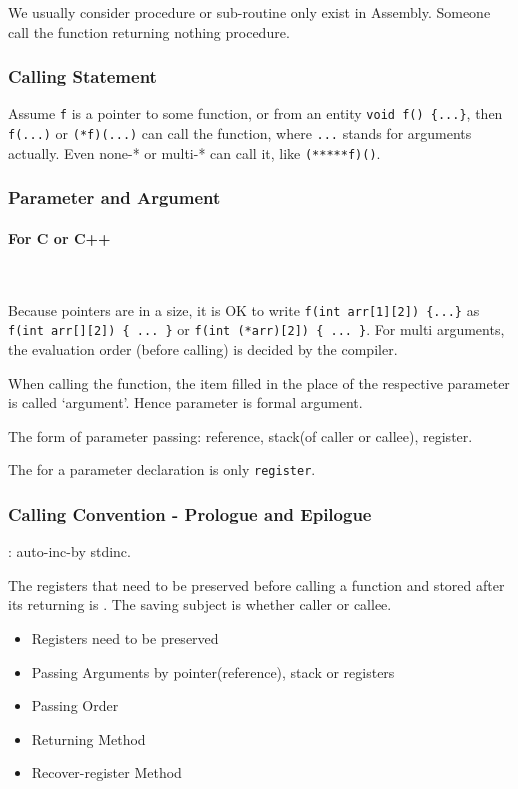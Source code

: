 
We usually consider procedure or sub-routine only exist in Assembly. %
Someone call the function returning nothing procedure. %

\subsubsection{Calling Statement}

Assume \verb`f` is a pointer to some function, or from an entity \verb`void f() {...}`, then \verb`f(...)` or \verb`(*f)(...)` can call the function, where \verb`...` stands for arguments actually. Even none-* or multi-* can call it, like \verb`(*****f)()`. %

\subsubsection{Parameter and Argument}

\paragraph{For C or C++}\

Because pointers are in a size, it is OK to write \verb`f(int arr[1][2]) {...}` as \verb`f(int arr[][2]) { ... }` or \verb`f(int (*arr)[2]) { ... }`.
For multi arguments, the evaluation order (before calling) is decided by the compiler.

When calling the function, the item filled in the place of the respective parameter is called `argument'. Hence parameter is {formal argument}.

The form of parameter passing: reference, stack(of caller or callee), register.

The  for a parameter declaration is only \verb`register`.

\subsubsection{Calling Convention \mbox{-} Prologue and Epilogue }

: auto-inc-by stdinc.

The registers that need to be preserved before calling a function and stored after its returning is . The saving subject is whether caller or callee.

\begin{itemize}
	\item Registers need to be preserved
	\item Passing Arguments by pointer(reference), stack or registers
	\item Passing Order
	\item Returning Method
	\item Recover-register Method
\end{itemize}

